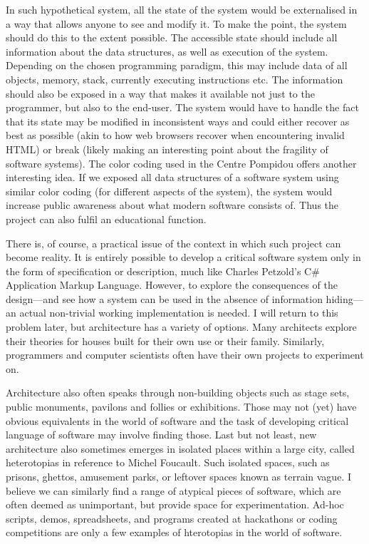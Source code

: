 In such hypothetical system, all the state of the system
would be externalised in a way that allows anyone to see and modify it. To make the point,
the system should do this to the extent possible. The accessible state should include all
information about the data structures, as well as execution of the system. Depending on the
chosen programming paradigm, this may include data of all objects, memory, stack, currently
executing instructions etc. The information should also be exposed in a way that makes it
available not just to the programmer, but also to the end-user. The system would have to handle the fact that
its state may be modified in inconsistent ways and could either recover as best as possible
(akin to how web browsers recover when encountering invalid HTML) or break (likely making an
interesting point about the fragility of software systems).
The color coding used in the Centre Pompidou offers another interesting idea. If we exposed
all data structures of a software system using similar color coding (for different aspects
of the system), the system would increase public awareness about what modern software consists
of. Thus the project can also fulfil an educational function.

There is, of course, a practical issue of the context in which such project can become
reality. It is entirely possible to develop a critical software system only in the form of
specification or description, much like Charles Petzold's C\# Application Markup Language.
However, to explore the consequences of the design---and see how a system can be used in
the absence of information hiding---an actual non-trivial working implementation is needed.
I will return to this problem later, but architecture has a variety of options. Many
architects explore their theories for houses built for their own use or their
family. Similarly, programmers and computer
scientists often have their own projects to experiment on.

Architecture also often speaks through
non-building objects such as stage sets, public monuments, pavilons and follies or exhibitions.
Those may not (yet) have obvious equivalents in the world of software and the task of developing
critical language of software may involve finding those. Last but not least, new architecture
also sometimes emerges in isolated places within a large city, called heterotopias in reference
to Michel Foucault. Such isolated spaces, such as prisons, ghettos,
amusement parks, or leftover spaces known as terrain vague.
I believe we can similarly find a range of atypical pieces of software, which are often deemed
as unimportant, but provide space for experimentation. Ad-hoc scripts, demos, spreadsheets,
and programs created at hackathons or coding competitions are only a few examples of hterotopias
in the world of software.




